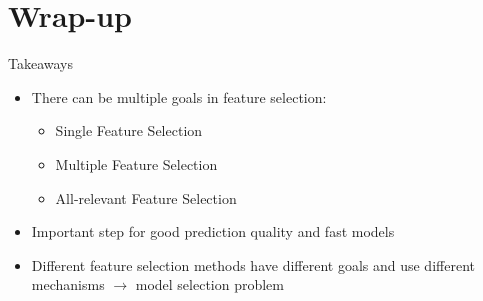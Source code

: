 \documentclass[11pt,compress,t,notes=noshow, xcolor=table]{beamer}
\begin{document}
\section{Wrap-up}

\begin{frame}{Takeaways}
    \vfill
    \begin{itemize}
        \item There can be multiple goals in feature selection:
        \begin{itemize}
            \item Single Feature Selection
            \item Multiple Feature Selection
            \item All-relevant Feature Selection
        \end{itemize}
        \item Important step for good prediction quality and fast models
        \item Different feature selection methods have different goals and use different mechanisms $\rightarrow$ model selection problem
    \end{itemize}
    \vfill
\end{frame}

\endlecture
\end{document}
